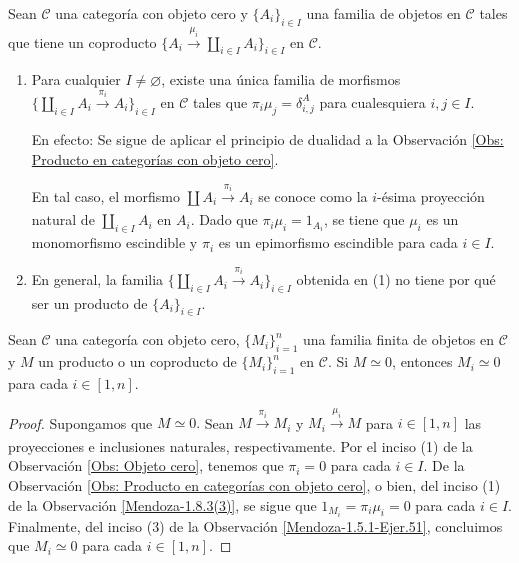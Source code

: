\documentclass[tesis]{subfiles}
\begin{document}
\begin{Obs}\label{Mendoza-1.8.3(3)}
    Sean $\mathscr{C}$ una categoría con objeto cero y $\{A_i\}_{i\in I}$ una familia de objetos en $\mathscr{C}$ tales que tiene un coproducto $\{A_i\xrightarrow[]{\mu_i} \coprod_{i\in I}A_i\}_{i\in I}$ en $\mathscr{C}$.

    \begin{enumerate}[label=(\arabic*)]
    
        \item Para cualquier $I\neq\varnothing$, existe una única familia de morfismos $\{\coprod_{i\in I}A_i\xrightarrow[]{\pi_i} A_i\}_{i\in I}$ en $\mathscr{C}$ tales que $\pi_i\mu_j = \delta^A_{i,j}$ para cualesquiera $i,j\in I$. 

            \vspace{1mm}
            En efecto: Se sigue de aplicar el principio de dualidad a la Observación \ref{Obs: Producto en categorías con objeto cero}.

            En tal caso, el morfismo $\coprod A_i\xrightarrow[]{\pi_i} A_i$ se conoce como la $i$-ésima proyección natural de $\coprod_{i\in I}A_i$ en $A_i$. Dado que $\pi_i\mu_i=1_{A_i}$, se tiene que $\mu_i$ es un monomorfismo escindible y $\pi_i$ es un epimorfismo escindible para cada $i\in I$.

        \item En general, la familia $\{\coprod_{i\in I}A_i\xrightarrow[]{\pi_i} A_i\}_{i\in I}$ obtenida en (1) no tiene por qué ser un producto de $\{A_i\}_{i\in I}$. %
    \end{enumerate}
\end{Obs}

\begin{Prop}\label{Mendoza_CT-Ejer.21}
    Sean $\mathscr{C}$ una categoría con objeto cero, $\{M_i\}_{i=1}^n$ una familia finita de objetos en $\mathscr{C}$ y $M$ un producto o un coproducto de $\{M_i\}_{i=1}^n$ en $\mathscr{C}$. Si $M \simeq 0$, entonces $M_i \simeq 0$ para cada $i \in [1,n].$
\end{Prop}

\begin{proof}
    Supongamos que  $M \simeq 0.$ Sean $M \xrightarrow[]{\pi_i} M_i$ y $M_i \xrightarrow[]{\mu_i} M$ para $i\in[1,n]$ las proyecciones e inclusiones naturales, respectivamente. Por el inciso (1) de la Observación \ref{Obs: Objeto cero}, tenemos que $\pi_i=0$ para cada $i \in I$. De la Observación \ref{Obs: Producto en categorías con objeto cero}, o bien, del inciso (1) de la Observación \ref{Mendoza-1.8.3(3)}, se sigue que $1_{M_i} = \pi_i \mu_i =0$ para cada $i \in I$. Finalmente, del inciso (3) de la Observación \ref{Mendoza-1.5.1-Ejer.51}, concluimos que $M_i\simeq0$ para cada $i\in[1,n]$.
\end{proof}
\end{document}
